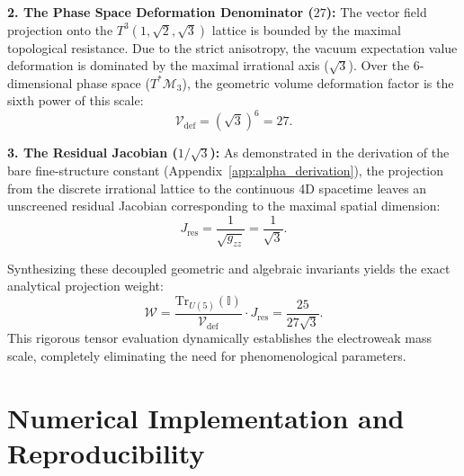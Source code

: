\documentclass[onecolumn,aps,prd,superscriptaddress,nofootinbib,amsmath,amssymb]{revtex4-2}
\theoremstyle{definition}
\theoremstyle{remark}
\newcommand{\Tthree}{T^3(1,\sqrt{2},\sqrt{3})}
\begin{document}
\textbf{2. The Phase Space Deformation Denominator ($27$):} 
The vector field projection onto the $\Tthree$ lattice is bounded by the maximal topological resistance. Due to the strict anisotropy, the vacuum expectation value deformation is dominated by the maximal irrational axis ($\sqrt{3}$). Over the 6-dimensional phase space ($T^* \mathcal{M}_{3}$), the geometric volume deformation factor is the sixth power of this scale:
\begin{equation}
\mathcal{V}_{\text{def}} = (\sqrt{3})^6 = 27.
\end{equation}

\textbf{3. The Residual Jacobian ($1/\sqrt{3}$):} 
As demonstrated in the derivation of the bare fine-structure constant (Appendix~\ref{app:alpha_derivation}), the projection from the discrete irrational lattice to the continuous 4D spacetime leaves an unscreened residual Jacobian corresponding to the maximal spatial dimension:
\begin{equation}
J_{\text{res}} = \frac{1}{\sqrt{g_{zz}}} = \frac{1}{\sqrt{3}}.
\end{equation}

Synthesizing these decoupled geometric and algebraic invariants yields the exact analytical projection weight:
\begin{equation}
\mathcal{W} = \frac{\text{Tr}_{U(5)}(\mathbb{I})}{\mathcal{V}_{\text{def}}} \cdot J_{\text{res}} = \frac{25}{27\sqrt{3}}.
\end{equation}
This rigorous tensor evaluation dynamically establishes the electroweak mass scale, completely eliminating the need for phenomenological parameters.

\section{Numerical Implementation and Reproducibility}
\label{app:code}
\end{document}
